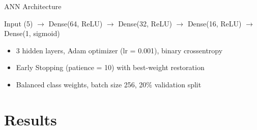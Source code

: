 \documentclass[aspectratio=169]{beamer}
\begin{document}
\begin{frame}{ANN Architecture}
\begin{center}
Input (5) $\rightarrow$ Dense(64, ReLU) $\rightarrow$ Dense(32, ReLU) $\rightarrow$ Dense(16, ReLU) $\rightarrow$ Dense(1, sigmoid)
\end{center}

\vspace{0.3cm}
\begin{itemize}
    \item 3 hidden layers, Adam optimizer (lr = 0.001), binary crossentropy
    \item Early Stopping (patience = 10) with best-weight restoration
    \item Balanced class weights, batch size 256, 20\% validation split
\end{itemize}
\end{frame}

\section{Results}
\end{document}
